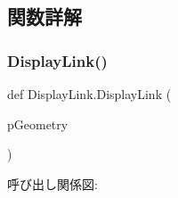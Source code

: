 \subsection{関数詳解}
\mbox{\label{namespace_display_link_af46b3c09f8eb4c76ceb6fd791e735a5c}} 
\subsubsection{\texorpdfstring{Display\+Link()}{DisplayLink()}}
{\footnotesize\ttfamily def Display\+Link.\+Display\+Link (\begin{DoxyParamCaption}\item[{}]{p\+Geometry }\end{DoxyParamCaption})}

呼び出し関係図\+:
